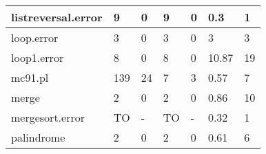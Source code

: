 \begin{table}
{\begin{tabular}{|l|l|l|l|l|l|l|}
    listreversal.error                                       & 9                                     & 0                                          & 9                                     & 0                                          & 0.3                                                             & 1                                        \\ \hline
    loop.error                                               & 3                                     & 0                                          & 3                                     & 0                                          & 3                                                               & 3                                        \\ \hline
    loop1.error                                              & 8                                     & 0                                          & 8                                     & 0                                          & 10.87                                                           & 19                                       \\ \hline
    mc91.pl                                                  & 139                                   & 24                                         & 7                                     & 3                                          & 0.57                                                            & 7                                        \\ \hline
    merge                                                    & 2                                     & 0                                          & 2                                     & 0                                          & 0.86                                                            & 10                                       \\ \hline
    mergesort.error                                          & TO                                    & -                                          & TO                                    & -                                          & 0.32                                                            & 1                                        \\ \hline
    palindrome                                               & 2                                     & 0                                          & 2                                     & 0                                          & 0.61                                                            & 6                                        \\ \hline

\end{tabular}}
\end{table}
